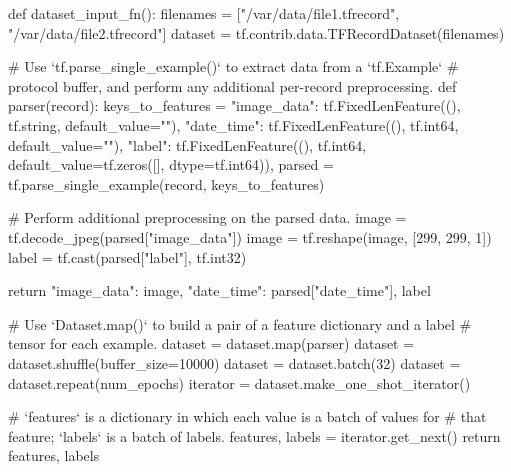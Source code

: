 \begin{python}
def dataset_input_fn():
    filenames = ["/var/data/file1.tfrecord", "/var/data/file2.tfrecord"]
    dataset = tf.contrib.data.TFRecordDataset(filenames)

# Use `tf.parse\_single\_example()` to extract data from a `tf.Example`
# protocol buffer, and perform any additional per-record preprocessing.
    def parser(record):
        keys_to_features = {
            "image_data": tf.FixedLenFeature((), tf.string, default_value=""),
            "date_time": tf.FixedLenFeature((), tf.int64, default_value=""),
            "label": tf.FixedLenFeature((), tf.int64,
                                    default_value=tf.zeros([], dtype=tf.int64)),
    }
        parsed = tf.parse_single_example(record, keys_to_features)

        # Perform additional preprocessing on the parsed data.
        image = tf.decode_jpeg(parsed["image_data"])
        image = tf.reshape(image, [299, 299, 1])
        label = tf.cast(parsed["label"], tf.int32)

        return {"image_data": image, "date_time": parsed["date_time"]}, label

  # Use `Dataset.map()` to build a pair of a feature dictionary and a label 
  # tensor for each example.
  dataset = dataset.map(parser)
  dataset = dataset.shuffle(buffer_size=10000)
  dataset = dataset.batch(32)
  dataset = dataset.repeat(num_epochs)
  iterator = dataset.make_one_shot_iterator()

  # `features` is a dictionary in which each value is a batch of values for
  # that feature; `labels` is a batch of labels.
  features, labels = iterator.get_next()
  return features, labels
\end{python}
